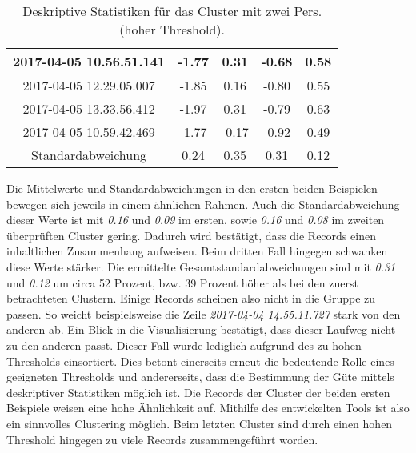 \begin{table}[ht]
\begin{center}
\begin{tabular}{ |c|c|c|c|c| }
      \hline
      2017-04-05 10.56.51.141 & -1.77 & 0.31 & -0.68 & 0.58 \\
      \hline
      2017-04-05 12.29.05.007 & -1.85 & 0.16 & -0.80 & 0.55 \\
      \hline
      2017-04-05 13.33.56.412 & -1.97 & 0.31 & -0.79 & 0.63 \\
      \hline
      2017-04-05 10.59.42.469 & -1.77 & -0.17 & -0.92 & 0.49 \\
      \hline
      \hline
      Standardabweichung & 0.24 & 0.35 & 0.31 & 0.12 \\
      \hline
     \end{tabular}
    \caption{Deskriptive Statistiken für das Cluster mit zwei Pers. (hoher Threshold).}
    \label{tbl:ClustTwoPersHighThreshold}
  \end{center}
\end{table}
Die Mittelwerte und Standardabweichungen in den ersten beiden Beispielen
bewegen sich jeweils in einem ähnlichen Rahmen.
Auch die Standardabweichung dieser Werte ist mit \emph{0.16} und \emph{0.09} im ersten,
sowie \emph{0.16} und \emph{0.08} im zweiten überprüften Cluster gering.
Dadurch wird bestätigt, dass die Records einen inhaltlichen Zusammenhang aufweisen.
Beim dritten Fall hingegen schwanken diese Werte stärker.
Die ermittelte Gesamtstandardabweichungen sind mit \emph{0.31} und \emph{0.12} um
circa 52 Prozent, bzw. 39 Prozent höher als bei den zuerst betrachteten Clustern.
Einige Records scheinen also nicht in die Gruppe zu passen.
So weicht beispielsweise die Zeile \emph{2017-04-04 14.55.11.727} stark von den anderen ab.
Ein Blick in die Visualisierung bestätigt,
dass dieser Laufweg nicht zu den anderen passt.
Dieser Fall wurde lediglich aufgrund des zu hohen Thresholds einsortiert.
Dies betont einerseits erneut die bedeutende Rolle eines geeigneten Thresholds
und andererseits, dass die Bestimmung der Güte mittels deskriptiver Statistiken möglich ist.
Die Records der Cluster der beiden ersten Beispiele weisen eine hohe Ähnlichkeit auf.
Mithilfe des entwickelten Tools ist also ein sinnvolles Clustering möglich.
Beim letzten Cluster sind durch einen hohen Threshold hingegen zu viele Records zusammengeführt worden.